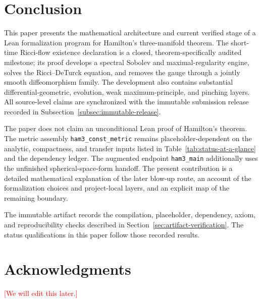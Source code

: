 \documentclass[11pt]{article}
\theoremstyle{plain}
\theoremstyle{definition}
\theoremstyle{remark}
\newcommand{\leanref}[1]{\nolinkurl{#1}}
\begin{document}
\section{Conclusion}

This paper presents the mathematical architecture and current verified stage
of a Lean formalization program for Hamilton's three-manifold theorem.  The
short-time Ricci-flow existence declaration is a closed, theorem-specifically
audited milestone; its proof develops a spectral Sobolev and maximal-regularity
engine, solves the Ricci--DeTurck equation, and removes the gauge through a
jointly smooth diffeomorphism family.  The development also contains
substantial differential-geometric, evolution, weak maximum-principle, and
pinching layers.  All source-level claims are synchronized with the immutable
submission release recorded in Subsection~\ref{subsec:immutable-release}.

The paper does not claim an unconditional Lean proof of Hamilton's theorem.
The metric assembly \leanref{ham3_const_metric} remains
placeholder-dependent on the analytic, compactness, and transfer inputs listed
in Table~\ref{tab:status-at-a-glance} and the dependency ledger.  The augmented
endpoint \leanref{ham3_main} additionally uses the unfinished
spherical-space-form handoff.  The present contribution is a detailed
mathematical explanation of the later blow-up route, an account of the
formalization choices and project-local layers, and an explicit map
of the remaining boundary.

The immutable artifact records the compilation, placeholder, dependency,
axiom, and reproducibility checks described in
Section~\ref{sec:artifact-verification}.  The status qualifications in this
paper follow those recorded results.

\section*{Acknowledgments}

\textcolor{red}{[We will edit this later.]}
\end{document}
